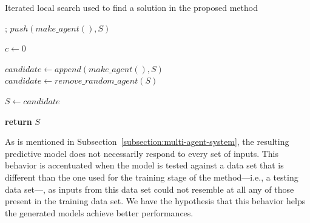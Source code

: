 ﻿\documentclass{ieeeaccess}
\begin{document}
\begin{algorithm}
  \caption{Iterated local search used to find a solution in the proposed method}
  \label{algorithm:ils}
  \begin{algorithmic}[1]
    ;
    \State $push(make\_agent(), S)$ %

    \State $c \gets 0$

    \State $candidate \gets append(make\_agent(), S)$
    \Else
    \State $candidate \gets remove\_random\_agent(S)$
    \EndIf

    \State $S \gets candidate$
    \EndIf
    
    \EndWhile

    \State \textbf{return} $S$
    \EndProcedure
  \end{algorithmic}
\end{algorithm}

As is mentioned in Subsection~\ref{subsection:multi-agent-system}, the
resulting predictive model does not necessarily respond to every set
of inputs. This behavior is accentuated when the model is tested
against a data set that is different than the one used for the
training stage of the method---i.e., a testing data set---, as inputs
from this data set could not resemble at all any of those present in
the training data set. We have the hypothesis that this behavior helps
the generated models achieve better performances.


\end{document}
